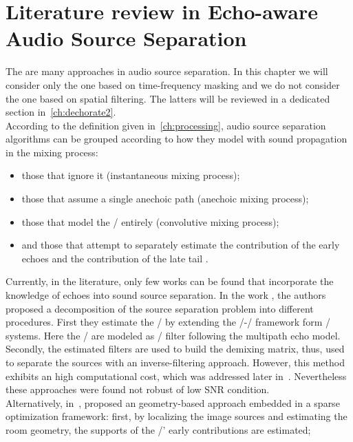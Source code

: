 \section{Literature review in Echo-aware Audio Source Separation}
The are many approaches in audio source separation.
In this chapter we will consider only the one based on time-frequency masking and we do not consider the one based on spatial filtering.
The latters will be reviewed in a dedicated section in~\cref{ch:dechorate2}.
\\According to the definition given in~\cref{ch:processing}, audio source separation algorithms can be grouped according to how they model with sound propagation in the mixing process:
\begin{itemize}
    \item those that ignore it  (instantaneous mixing process);
    \item those that assume a single anechoic path  (anechoic mixing process);
    \item those that model the \RTFs/ entirely  (convolutive mixing process);
    \item and those that attempt to separately estimate the contribution of the early echoes and the contribution of the late tail .
\end{itemize}
Currently, in the literature, only few works can be found that incorporate the knowledge of echoes into sound source separation.
In the work , the authors proposed a decomposition of the source separation problem into different procedures.
First they estimate the \RIRs/ by extending the \SIMO/-\BCE/ framework form \MIMO/ systems.
Here the \RIR/ are modeled as \FIR/ filter following the multipath echo model.
Secondly, the estimated filters are used to build the demixing matrix, thus, used to separate the sources with an inverse-filtering approach.
However, this method exhibits an high computational cost, which was addressed later in~.
Nevertheless these approaches were found not robust of low SNR condition.
\\Alternatively, in~, proposed an geometry-based approach embedded in a sparse optimization framework:
first, by localizing the image sources and estimating the room geometry, the supports of the \RIRs/' early contributions are estimated;
